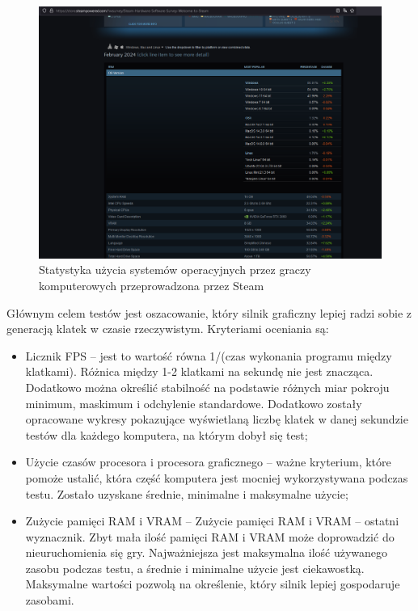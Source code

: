 \documentclass[12pt,twoside]{article}
\begin{document}
\begin{figure}[H]
    \centering
    \includegraphics[width=14cm]{figures/SteamHardwareSoftwareSurvay.png}
    \caption{Statystyka użycia systemów operacyjnych przez graczy komputerowych przeprowadzona przez Steam \cite{SteamSurvey}}
    \label{SteamHardwareSoftwareSurvay}
\end{figure}



Głównym celem testów jest oszacowanie, który silnik graficzny lepiej radzi sobie
z generacją klatek w czasie rzeczywistym. Kryteriami oceniania są:

\begin{itemize}
\item Licznik FPS – jest to wartość równa 1/(czas wykonania programu między
klatkami). Różnica między 1-2 klatkami na sekundę nie jest znacząca. Dodatkowo
można określić stabilność na podstawie różnych miar pokroju minimum, maskimum i
odchylenie standardowe. Dodatkowo zostały opracowane wykresy pokazujące
wyświetlaną liczbę klatek w danej sekundzie testów dla każdego komputera, na
którym dobył się test;   
\item Użycie czasów procesora i procesora graficznego – ważne kryterium, które
pomoże ustalić, która część komputera jest mocniej wykorzystywana podczas testu.
Zostało uzyskane średnie, minimalne i maksymalne użycie; 
\item Zużycie pamięci RAM i VRAM – Zużycie pamięci RAM i VRAM – ostatni
wyznacznik. Zbyt mała ilość pamięci RAM i VRAM może doprowadzić do
nieuruchomienia się gry.  Najważniejsza jest maksymalna ilość używanego zasobu
podczas testu, a średnie i minimalne użycie jest ciekawostką. Maksymalne
wartości pozwolą na określenie, który silnik lepiej gospodaruje zasobami. 
\end{itemize}
\end{document}
